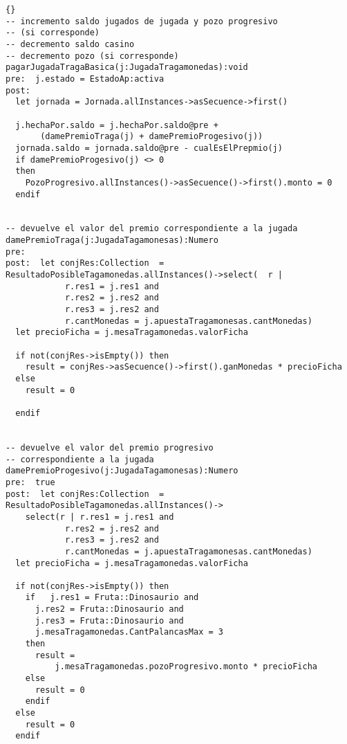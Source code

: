 \begin{framed}
\begin{lstlisting}[frame=trbl]{}
-- incremento saldo jugados de jugada y pozo progresivo 
-- (si corresponde)
-- decremento saldo casino
-- decremento pozo (si corresponde)
pagarJugadaTragaBasica(j:JugadaTragamonedas):void
pre:  j.estado = EstadoAp:activa
post:  
  let jornada = Jornada.allInstances->asSecuence->first()

  j.hechaPor.saldo = j.hechaPor.saldo@pre + 
       (damePremioTraga(j) + damePremioProgesivo(j))
  jornada.saldo = jornada.saldo@pre - cualEsElPrepmio(j)
  if damePremioProgesivo(j) <> 0
  then
    PozoProgresivo.allInstances()->asSecuence()->first().monto = 0
  endif


-- devuelve el valor del premio correspondiente a la jugada
damePremioTraga(j:JugadaTagamonesas):Numero
pre:  
post:  let conjRes:Collection  = 
ResultadoPosibleTagamonedas.allInstances()->select(  r |   
            r.res1 = j.res1 and
            r.res2 = j.res2 and
            r.res3 = j.res2 and
            r.cantMonedas = j.apuestaTragamonesas.cantMonedas) 
  let precioFicha = j.mesaTragamonedas.valorFicha

  if not(conjRes->isEmpty()) then
    result = conjRes->asSecuence()->first().ganMonedas * precioFicha 
  else
    result = 0

  endif 


-- devuelve el valor del premio progresivo 
-- correspondiente a la jugada
damePremioProgesivo(j:JugadaTagamonesas):Numero
pre:  true
post:  let conjRes:Collection  = 
ResultadoPosibleTagamonedas.allInstances()->
	select(r | r.res1 = j.res1 and
            r.res2 = j.res2 and
            r.res3 = j.res2 and
            r.cantMonedas = j.apuestaTragamonesas.cantMonedas) 
  let precioFicha = j.mesaTragamonedas.valorFicha

  if not(conjRes->isEmpty()) then
    if   j.res1 = Fruta::Dinosaurio and
      j.res2 = Fruta::Dinosaurio and
      j.res3 = Fruta::Dinosaurio and
      j.mesaTragamonedas.CantPalancasMax = 3
    then
      result = 
          j.mesaTragamonedas.pozoProgresivo.monto * precioFicha 
    else
      result = 0
    endif
  else
    result = 0
  endif 
  
\end{lstlisting}

\end{framed}
